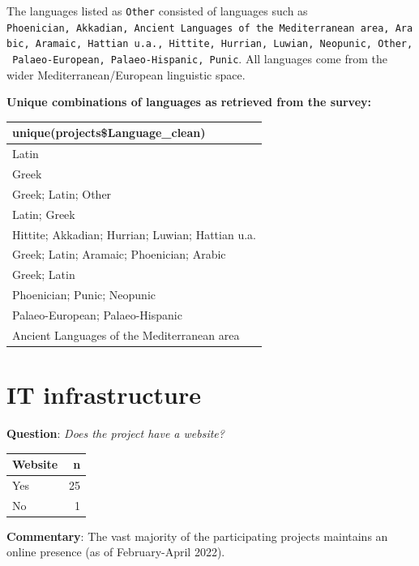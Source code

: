 \documentclass[
  12pt,
]{scrreprt}
\begin{document}
The languages listed as \texttt{Other} consisted of languages such as
\texttt{Phoenician,\ Akkadian,\ Ancient\ Languages\ of\ the\ Mediterranean\ area,\ Arabic,\ Aramaic,\ Hattian\ u.a.,\ Hittite,\ Hurrian,\ Luwian,\ Neopunic,\ Other,\ Palaeo-European,\ Palaeo-Hispanic,\ Punic}.
All languages come from the wider Mediterranean/European linguistic
space.

\textbf{Unique combinations of languages as retrieved from the survey:}

\footnotesize

\begin{longtable}[]{@{}l@{}}
\toprule
unique(projects\$Language\_clean) \\
\midrule
\endhead
Latin \\
Greek \\
Greek; Latin; Other \\
Latin; Greek \\
Hittite; Akkadian; Hurrian; Luwian; Hattian u.a. \\
Greek; Latin; Aramaic; Phoenician; Arabic \\
Greek; Latin \\
Phoenician; Punic; Neopunic \\
Palaeo-European; Palaeo-Hispanic \\
Ancient Languages of the Mediterranean area \\
\bottomrule
\end{longtable}

\normalsize

\hypertarget{it-infrastructure-1}{%
\section{IT infrastructure}\label{it-infrastructure-1}}

\textbf{Question}: \emph{Does the project have a website?}

\footnotesize

\begin{longtable}[]{@{}lr@{}}
\toprule
Website & n \\
\midrule
\endhead
Yes & 25 \\
No & 1 \\
\bottomrule
\end{longtable}

\normalsize

\textbf{Commentary}: The vast majority of the participating projects
maintains an online presence (as of February-April 2022).
\end{document}
